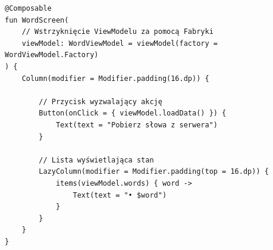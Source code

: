 \begin{verbatim}
@Composable
fun WordScreen(
    // Wstrzyknięcie ViewModelu za pomocą Fabryki
    viewModel: WordViewModel = viewModel(factory = WordViewModel.Factory)
) {
    Column(modifier = Modifier.padding(16.dp)) {
        
        // Przycisk wyzwalający akcję
        Button(onClick = { viewModel.loadData() }) {
            Text(text = "Pobierz słowa z serwera")
        }

        // Lista wyświetlająca stan
        LazyColumn(modifier = Modifier.padding(top = 16.dp)) {
            items(viewModel.words) { word ->
                Text(text = "• $word")
            }
        }
    }
}
\end{verbatim}